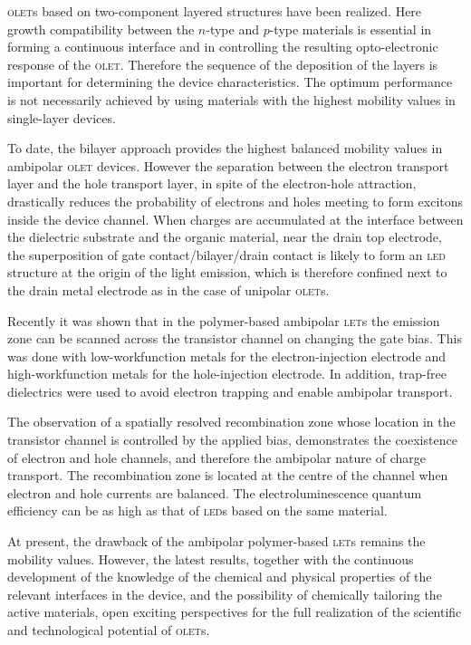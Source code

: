 \textsc{olet}s based on two-component layered structures have been realized. Here growth compatibility between the $n$-type and $p$-type materials is essential in forming a continuous interface and in controlling the resulting opto-electronic response of the \textsc{olet}. Therefore the sequence of the deposition of the layers is important for determining the device characteristics. The optimum performance is not necessarily achieved by using materials with the highest mobility values in single-layer devices. 

To date, the bilayer approach provides the highest balanced mobility values in ambipolar \textsc{olet} devices. However the separation between the electron transport layer and the hole transport layer, in spite of the electron-hole attraction, drastically reduces the probability of electrons and holes meeting to form excitons inside the device channel. When charges are accumulated at the interface between the dielectric substrate and the organic material, near the drain top electrode, the superposition of gate contact/bilayer/drain contact is likely to form an \textsc{led} structure at the origin of the light emission, which is therefore confined next to the drain metal electrode as in the case of unipolar \textsc{olet}s.

Recently it was shown that in the polymer-based ambipolar \textsc{let}s the emission zone can be scanned across the transistor channel on changing the gate bias. This was done with low-workfunction metals for the electron-injection electrode and high-workfunction metals for the hole-injection electrode. In addition, trap-free dielectrics were used to avoid electron trapping and enable ambipolar transport. 

The observation of a spatially resolved recombination zone whose location in the transistor channel is controlled by the applied bias, demonstrates the coexistence of electron and hole channels, and therefore the ambipolar nature of charge transport. The recombination zone is located at the centre of the channel when electron and hole currents are balanced. The electroluminescence quantum efficiency can be as high as that of \textsc{led}s based on the same material. 

At present, the drawback of the ambipolar polymer-based \textsc{let}s remains the mobility values. However, the latest results, together with the continuous development of the knowledge of the chemical and physical properties of the relevant interfaces in the device, and the possibility of chemically tailoring the active materials, open exciting perspectives for the full realization of the scientific and technological potential of \textsc{olet}s.




